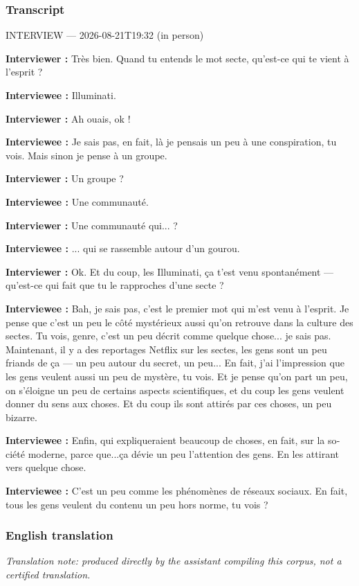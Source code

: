 \subsubsection*{Transcript}
\begin{otherlanguage}{french}
INTERVIEW — 2026-08-21T19:32 (in person)

\textbf{Interviewer :} Très bien. Quand tu entends le mot secte, qu'est-ce qui te vient à l'esprit ?

\textbf{Interviewee :} Illuminati.

\textbf{Interviewer :} Ah ouais, ok !

\textbf{Interviewee :} Je sais pas, en fait, là je pensais un peu à une conspiration, tu vois. Mais sinon je pense à un groupe.

\textbf{Interviewer :} Un groupe ?

\textbf{Interviewee :} Une communauté.

\textbf{Interviewer :} Une communauté qui... ?

\textbf{Interviewee :} ... qui se rassemble autour d'un gourou.

\textbf{Interviewer :} Ok. Et du coup, les Illuminati, ça t'est venu spontanément — qu'est-ce qui fait que tu le rapproches d'une secte ?

\textbf{Interviewee :} Bah, je sais pas, c'est le premier mot qui m'est venu à l'esprit. Je pense que c'est un peu le côté mystérieux aussi qu'on retrouve dans la culture des sectes. Tu vois, genre, c'est un peu décrit comme quelque chose... je sais pas. Maintenant, il y a des reportages Netflix sur les sectes, les gens sont un peu friands de ça — un peu autour du secret, un peu... En fait, j'ai l'impression que les gens veulent aussi un peu de mystère, tu vois. Et je pense qu'on part un peu, on s'éloigne un peu de certains aspects scientifiques, et du coup les gens veulent donner du sens aux choses. Et du coup ils sont attirés par ces choses, un peu bizarre.

\textbf{Interviewee :} Enfin, qui expliqueraient beaucoup de choses, en fait, sur la société moderne, parce que...ça dévie un peu l'attention des gens. En les attirant vers quelque chose.

\textbf{Interviewee :} C'est un peu comme les phénomènes de réseaux sociaux. En fait, tous les gens veulent du contenu un peu hors norme, tu vois ?
\end{otherlanguage}
\subsubsection*{English translation}
\textit{Translation note: produced directly by the assistant compiling this corpus, not a certified translation.}

